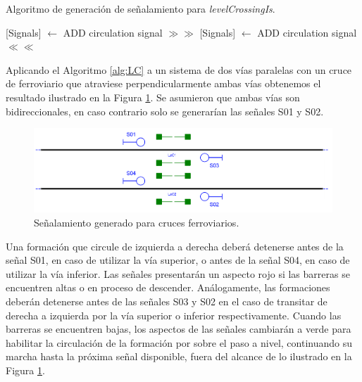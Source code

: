     \begin{algorithm}[H]
        \caption{Algoritmo de generación de señalamiento para \textit{levelCrossingIs}.}\label{alg:LC}
        \DontPrintSemicolon
        \SetNoFillComment
        \LinesNotNumbered 
        {
            [Signals] $\gets$ ADD circulation signal $\gg\gg$\;
            [Signals] $\gets$ ADD circulation signal $\ll\ll$\;
        }
        \KwResult{[Signals]} 
    \end{algorithm}    
    
    Aplicando el Algoritmo \ref{alg:LC} a un sistema de dos vías paralelas con un cruce de ferroviario que atraviese perpendicularmente ambas vías obtenemos el resultado ilustrado en la Figura \ref{fig:signal_crossing}. Se asumieron que ambas vías son bidireccionales, en caso contrario solo se generarían las señales S01 y S02.
    
    \begin{figure}[H]
        \centering
        \includegraphics[width=1\textwidth]{Figuras/crossings.PNG}
        \centering\caption{Señalamiento generado para cruces ferroviarios.}
        \label{fig:signal_crossing}
    \end{figure}
    
    Una formación que circule de izquierda a derecha deberá detenerse antes de la señal S01, en caso de utilizar la vía superior, o antes de la señal S04, en caso de utilizar la vía inferior. Las señales presentarán un aspecto rojo si las barreras se encuentren altas o en proceso de descender. Análogamente, las formaciones deberán detenerse antes de las señales S03 y S02 en el caso de transitar de derecha a izquierda por la vía superior o inferior respectivamente. Cuando las barreras se encuentren bajas, los aspectos de las señales cambiarán a verde para habilitar la circulación de la formación por sobre el paso a nivel, continuando su marcha hasta la próxima señal disponible, fuera del alcance de lo ilustrado en la Figura \ref{fig:signal_crossing}.    